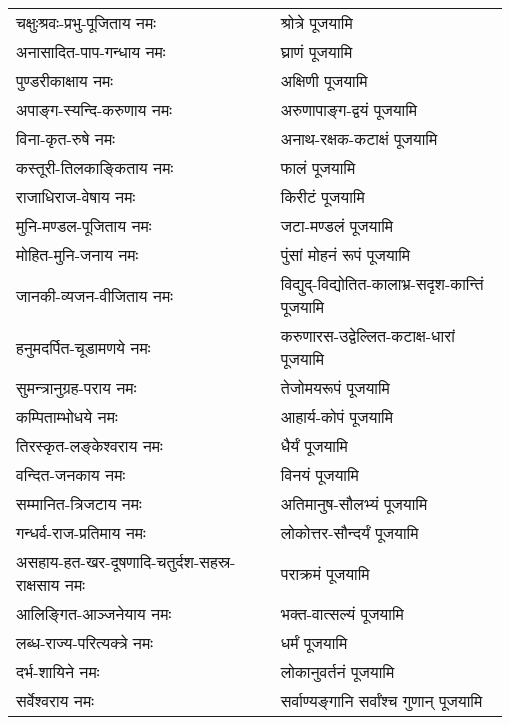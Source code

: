 \begin{supertabular}{p{0.525\linewidth}p{0.45\linewidth}}
चक्षुःश्रवः-प्रभु-पूजिताय नमः & श्रोत्रे पूजयामि \\
अनासादित-पाप-गन्धाय नमः & घ्राणं पूजयामि \\
पुण्डरीकाक्षाय नमः & अक्षिणी पूजयामि \\
अपाङ्ग-स्यन्दि-करुणाय नमः & अरुणापाङ्ग-द्वयं पूजयामि \\
विना-कृत-रुषे नमः & अनाथ-रक्षक-कटाक्षं पूजयामि \\
कस्तूरी-तिलकाङ्किताय नमः & फालं पूजयामि \\
राजाधिराज-वेषाय नमः & किरीटं पूजयामि \\
मुनि-मण्डल-पूजिताय नमः & जटा-मण्डलं पूजयामि \\
मोहित-मुनि-जनाय नमः & पुंसां मोहनं रूपं पूजयामि \\
जानकी-व्यजन-वीजिताय नमः & विद्युद्-विद्योतित-कालाभ्र-सदृश-कान्तिं पूजयामि \\
हनुमदर्पित-चूडामणये नमः & करुणारस-उद्वेल्लित-कटाक्ष-धारां पूजयामि \\
सुमन्त्रानुग्रह-पराय नमः & तेजोमयरूपं पूजयामि \\
कम्पिताम्भोधये नमः & आहार्य-कोपं पूजयामि \\
तिरस्कृत-लङ्केश्वराय नमः & धैर्यं पूजयामि \\
वन्दित-जनकाय नमः & विनयं पूजयामि \\
सम्मानित-त्रिजटाय नमः & अतिमानुष-सौलभ्यं पूजयामि \\
गन्धर्व-राज-प्रतिमाय नमः & लोकोत्तर-सौन्दर्यं पूजयामि \\
असहाय-हत-खर-दूषणादि-चतुर्दश-सहस्र-राक्षसाय नमः & पराक्रमं पूजयामि \\
आलिङ्गित-आञ्जनेयाय नमः & भक्त-वात्सल्यं पूजयामि \\
लब्ध-राज्य-परित्यक्त्रे नमः & धर्मं पूजयामि \\
दर्भ-शायिने नमः & लोकानुवर्तनं पूजयामि \\
सर्वेश्वराय नमः & सर्वाण्यङ्गानि सर्वांश्च गुणान् पूजयामि \\
\end{supertabular}

\begingroup
\setlength{\columnseprule}{1pt}
\let\chapt\sect
\centering






\endgroup


